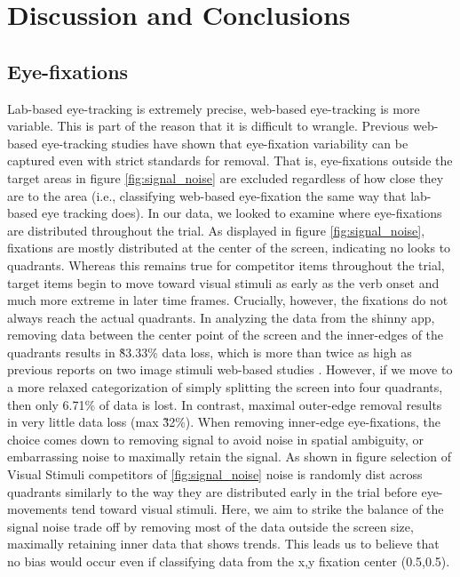 \section{Discussion and Conclusions}

\subsection{Eye-fixations}
Lab-based eye-tracking is extremely precise, web-based eye-tracking is more variable. This is part of the reason that it is difficult to wrangle. Previous web-based eye-tracking studies have shown that eye-fixation variability can be captured even with strict standards for removal. That is, eye-fixations outside the target areas in figure \ref{fig:signal_noise} are excluded regardless of how close they are to the area (i.e., classifying web-based eye-fixation the same way that lab-based eye tracking does). In our data, we looked to examine where eye-fixations are distributed throughout the trial. As displayed in figure \ref{fig:signal_noise}, fixations are mostly distributed at the center of the screen, indicating no looks to quadrants. Whereas this remains true for competitor items throughout the trial, target items begin to move toward visual stimuli as early as the verb onset and much more extreme in later time frames. Crucially, however, the fixations do not always reach the actual quadrants. In analyzing the data from the shinny app, removing data between the center point of the screen and the inner-edges of the quadrants results in \~83.33\% data loss, which is more than twice as high as previous reports on two image stimuli web-based studies \parencite{Vos_2017}. However, if we move to a more relaxed categorization of simply splitting the screen into four quadrants, then only 6.71\% of data is lost. In contrast, maximal outer-edge removal results in very little data loss (max \~32\%). When removing inner-edge eye-fixations, the choice comes down to removing signal to avoid noise in spatial ambiguity, or embarrassing noise to maximally retain the signal. As shown in figure selection of Visual Stimuli competitors of \ref{fig:signal_noise} noise is randomly dist across quadrants similarly to the way they are distributed early in the trial before eye-movements tend toward visual stimuli. Here, we aim to strike the balance of the signal noise trade off by removing most of the data outside the screen size, maximally retaining inner data that shows trends. This leads us to believe that no bias would occur even if classifying data from the x,y fixation center (0.5,0.5). 




